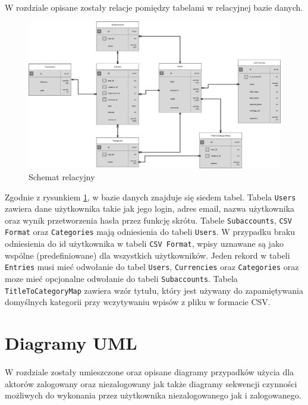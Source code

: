 \documentclass{article}
\begin{document}
	\paragraph{} W rozdziale opisane zostały relacje pomiędzy tabelami w relacyjnej bazie danych. 
	\begin{figure}[H]
		\centering
		\includegraphics[width=0.8\linewidth]{assets/er.jpg}
		\caption[]{Schemat relacyjny}
		\label{fig:er}
	\end{figure}
	
	Zgodnie z rysunkiem \ref{fig:er}, w bazie danych znajduje się siedem tabel. Tabela \texttt{Users} zawiera dane użytkownika takie jak jego login, adres email, nazwa użytkownika oraz wynik przetworzenia hasła przez funkcję skrótu. Tabele \texttt{Subaccounts}, \texttt{CSV Format} oraz \texttt{Categories} mają odniesienia do tabeli \texttt{Users}. W przypadku braku odniesienia do id użytkownika w tabeli \texttt{CSV Format}, wpisy uznawane są jako wspólne (predefiniowane) dla wszystkich użytkowników. Jeden rekord w tabeli \texttt{Entries} musi mieć odwołanie do tabel \texttt{Users}, \texttt{Currencies} oraz \texttt{Categories} oraz moze mieć opcjonalne odwołanie do tabeli \texttt{Subaccounts}. Tabela \texttt{TitleToCategoryMap} zawiera wzór tytułu, który jest używany do zapamiętywania domyślnych kategorii przy wczytywaniu wpisów z pliku w formacie CSV.
	\section{Diagramy UML}
	\paragraph*{} W rozdziale zostały umieszczone oraz opisane diagramy przypadków użycia dla aktorów zalogowany oraz niezalogowany jak także diagramy sekwencji czynności możliwych do wykonania przez użytkownika niezalogowanego jak i zalogowanego.
\end{document}
